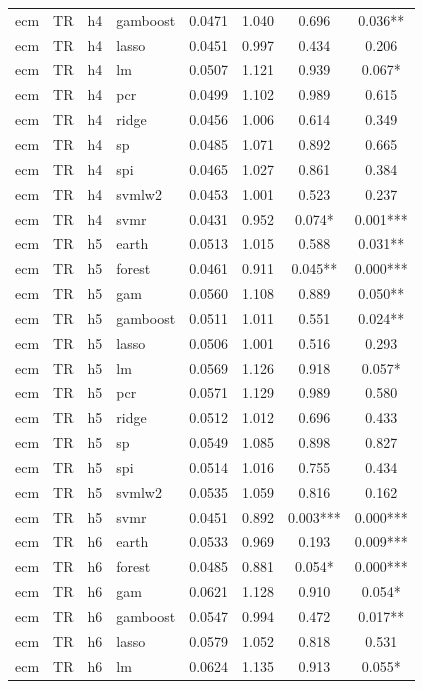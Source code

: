 \begin{ThreePartTable}
\begin{longtable}[t]{llclcccc}
ecm & TR & h4 & gamboost & 0.0471 & 1.040 & 0.696 & 0.036**\\
ecm & TR & h4 & lasso & 0.0451 & 0.997 & 0.434 & 0.206\\
ecm & TR & h4 & lm & 0.0507 & 1.121 & 0.939 & 0.067*\\
ecm & TR & h4 & pcr & 0.0499 & 1.102 & 0.989 & 0.615\\
ecm & TR & h4 & ridge & 0.0456 & 1.006 & 0.614 & 0.349\\
ecm & TR & h4 & sp & 0.0485 & 1.071 & 0.892 & 0.665\\
ecm & TR & h4 & spi & 0.0465 & 1.027 & 0.861 & 0.384\\
ecm & TR & h4 & svmlw2 & 0.0453 & 1.001 & 0.523 & 0.237\\
ecm & TR & h4 & svmr & 0.0431 & 0.952 & 0.074* & 0.001***\\
\addlinespace
ecm & TR & h5 & earth & 0.0513 & 1.015 & 0.588 & 0.031**\\
ecm & TR & h5 & forest & 0.0461 & 0.911 & 0.045** & 0.000***\\
ecm & TR & h5 & gam & 0.0560 & 1.108 & 0.889 & 0.050**\\
ecm & TR & h5 & gamboost & 0.0511 & 1.011 & 0.551 & 0.024**\\
ecm & TR & h5 & lasso & 0.0506 & 1.001 & 0.516 & 0.293\\
ecm & TR & h5 & lm & 0.0569 & 1.126 & 0.918 & 0.057*\\
ecm & TR & h5 & pcr & 0.0571 & 1.129 & 0.989 & 0.580\\
ecm & TR & h5 & ridge & 0.0512 & 1.012 & 0.696 & 0.433\\
ecm & TR & h5 & sp & 0.0549 & 1.085 & 0.898 & 0.827\\
ecm & TR & h5 & spi & 0.0514 & 1.016 & 0.755 & 0.434\\
ecm & TR & h5 & svmlw2 & 0.0535 & 1.059 & 0.816 & 0.162\\
ecm & TR & h5 & svmr & 0.0451 & 0.892 & 0.003*** & 0.000***\\
\addlinespace
ecm & TR & h6 & earth & 0.0533 & 0.969 & 0.193 & 0.009***\\
ecm & TR & h6 & forest & 0.0485 & 0.881 & 0.054* & 0.000***\\
ecm & TR & h6 & gam & 0.0621 & 1.128 & 0.910 & 0.054*\\
ecm & TR & h6 & gamboost & 0.0547 & 0.994 & 0.472 & 0.017**\\
ecm & TR & h6 & lasso & 0.0579 & 1.052 & 0.818 & 0.531\\
ecm & TR & h6 & lm & 0.0624 & 1.135 & 0.913 & 0.055*\\

\end{longtable}
\end{ThreePartTable}
